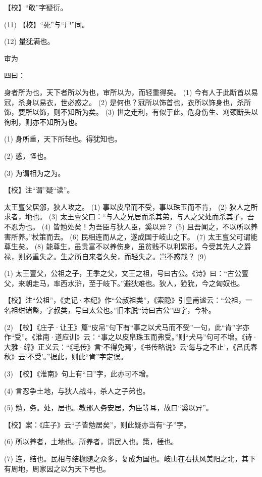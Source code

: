 \documentclass[12pt,UTF8]{ctexbook}
\begin{document}
【校】“敢”字疑衍。

(11) 【校】“死”与“尸”同。

(12) 量犹满也。





审为


四曰：

身者所为也，天下者所以为也，审所以为，而轻重得矣。 (1) 今有人于此断首以易冠，杀身以易衣，世必惑之。 (2) 是何也？冠所以饰首也，衣所以饰身也，杀所饰，要所以饰，则不知所为矣。 (3) 世之走利，有似于此。危身伤生、刈颈断头以徇利，则亦不知所为也。

(1) 身所重，天下所轻也。得犹知也。

(2) 惑，怪也。

(3) 为谓相为之为。

【校】注“谓”疑“读”。

太王亶父居邠，狄人攻之。 (1) 事以皮帛而不受，事以珠玉而不肯， (2) 狄人之所求者，地也。 (3) 太王亶父曰：“与人之兄居而杀其弟，与人之父处而杀其子，吾不忍为也。 (4) 皆勉处矣！为吾臣与狄人臣，奚以异？ (5) 且吾闻之，不以所以养害所养。”杖策而去。 (6) 民相连而从之，遂成国于岐山之下。 (7) 太王亶父可谓能尊生矣。 (8) 能尊生，虽贵富不以养伤身，虽贫贱不以利累形。今受其先人之爵禄，则必重失之。生之所自来者久矣，而轻失之。岂不惑哉？ (9)

(1) 太王亶父，公祖之子，王季之父，文王之祖，号曰古公。《诗》曰：“古公亶父，来朝走马，率西水浒，至于岐下。”避狄难也。狄人，猃狁，今之匈奴也。

【校】注“公祖”，《史记·本纪》作“公叔祖类”，《索隐》引皇甫谧云：“公祖，一名祖绀诸盩，字叔类，号曰太公也。”旧本脱“诗曰古公”四字，今补。

(2) 【校】《庄子·让王》篇“皮帛”句下有“事之以犬马而不受”一句，此“肯”字亦作“受”。《淮南·道应训》云：“事之以皮帛珠玉而弗受。”则“犬马”句可不增。《诗·大雅·绵》正义云：“《毛传》言‘不得免焉’，《书传略说》云‘每与之不止’，《吕氏春秋》云‘不受’。”据此，则此“肯”字定误。

(3) 【校】《淮南》句上有“曰”字，此亦可不增。

(4) 言忍争土地，与狄人战斗，杀人之子弟也。

(5) 勉，务。处，居也。教邠人务安居，为臣等耳，故曰“奚以异”。

【校】案：《庄子》云“子皆勉居矣”，则此疑亦当有“子”字。

(6) 所以养者，土地也。所养者，谓民人也。策，棰也。

(7) 连，结也。民相与结檐随之众多，复成为国也。岐山在右扶风美阳之北，其下有周地，周家因之以为天下号也。
\end{document}
